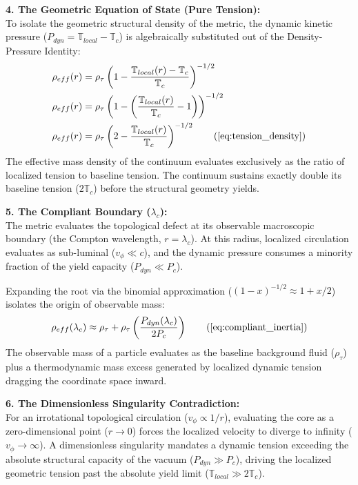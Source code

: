 \documentclass[11pt, a4paper]{article}
\begin{document}
\textbf{4. The Geometric Equation of State (Pure Tension):} \\
To isolate the geometric structural density of the metric, the dynamic kinetic pressure ($P_{dyn} = \mathbb{T}_{local} - \mathbb{T}_c$) is algebraically substituted out of the Density-Pressure Identity:
\begin{align}
    \rho_{eff}(r) &= \rho_{\tau} \left( 1 - \frac{\mathbb{T}_{local}(r) - \mathbb{T}_c}{\mathbb{T}_c} \right)^{-1/2} \nonumber \\
    \rho_{eff}(r) &= \rho_{\tau} \left( 1 - \left( \frac{\mathbb{T}_{local}(r)}{\mathbb{T}_c} - 1 \right) \right)^{-1/2} \nonumber \\
    \rho_{eff}(r) &= \rho_{\tau} \left( 2 - \frac{\mathbb{T}_{local}(r)}{\mathbb{T}_c} \right)^{-1/2} \tag{\ref{eq:tension_density}}
\end{align}
The effective mass density of the continuum evaluates exclusively as the ratio of localized tension to baseline tension. The continuum sustains exactly double its baseline tension ($2\mathbb{T}_c$) before the structural geometry yields.

\textbf{5. The Compliant Boundary ($\lambda_c$):} \\
The metric evaluates the topological defect at its observable macroscopic boundary (the Compton wavelength, $r = \lambda_c$). At this radius, localized circulation evaluates as sub-luminal ($v_\phi \ll c$), and the dynamic pressure consumes a minority fraction of the yield capacity ($P_{dyn} \ll P_c$).

Expanding the root via the binomial approximation ($(1-x)^{-1/2} \approx 1 + x/2$) isolates the origin of observable mass:
\begin{equation}
    \rho_{eff}(\lambda_c) \approx \rho_{\tau} + \rho_{\tau} \left( \frac{P_{dyn}(\lambda_c)}{2P_c} \right) \tag{\ref{eq:compliant_inertia}}
\end{equation}
The observable mass of a particle evaluates as the baseline background fluid ($\rho_{\tau}$) plus a thermodynamic mass excess generated by localized dynamic tension dragging the coordinate space inward.

\textbf{6. The Dimensionless Singularity Contradiction:} \\
For an irrotational topological circulation ($v_\phi \propto 1/r$), evaluating the core as a zero-dimensional point ($r \to 0$) forces the localized velocity to diverge to infinity ($v_\phi \to \infty$). A dimensionless singularity mandates a dynamic tension exceeding the absolute structural capacity of the vacuum ($P_{dyn} \gg P_c$), driving the localized geometric tension past the absolute yield limit ($\mathbb{T}_{local} \gg 2\mathbb{T}_c$).
\end{document}
